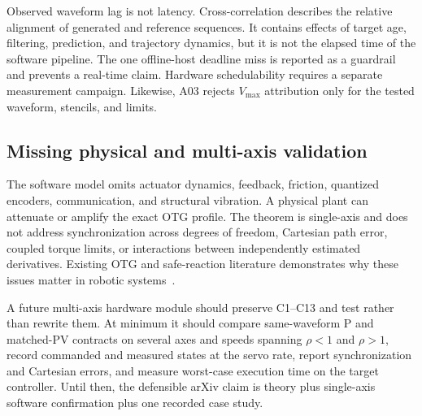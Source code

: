 Observed waveform lag is not latency. Cross-correlation describes the relative alignment of generated and reference sequences. It contains effects of target age, filtering, prediction, and trajectory dynamics, but it is not the elapsed time of the software pipeline. The one offline-host deadline miss is reported as a guardrail and prevents a real-time claim. Hardware schedulability requires a separate measurement campaign. Likewise, A03 rejects $V_{\max}$ attribution only for the tested waveform, stencils, and limits.

\subsection{Missing physical and multi-axis validation}

The software model omits actuator dynamics, feedback, friction, quantized encoders, communication, and structural vibration. A physical plant can attenuate or amplify the exact OTG profile. The theorem is single-axis and does not address synchronization across degrees of freedom, Cartesian path error, coupled torque limits, or interactions between independently estimated derivatives. Existing OTG and safe-reaction literature demonstrates why these issues matter in robotic systems~\cite{berscheid2021ruckig,haddadin2008collision,lange2016path}.

A future multi-axis hardware module should preserve C1--C13 and test rather than rewrite them. At minimum it should compare same-waveform P and matched-PV contracts on several axes and speeds spanning $\rho<1$ and $\rho>1$, record commanded and measured states at the servo rate, report synchronization and Cartesian errors, and measure worst-case execution time on the target controller. Until then, the defensible arXiv claim is theory plus single-axis software confirmation plus one recorded case study.
